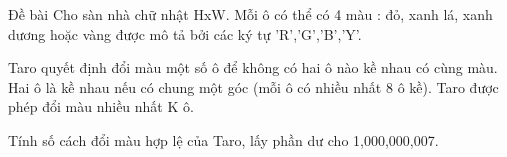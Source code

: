 Đề bài
Cho sàn nhà chữ nhật HxW. Mỗi ô có thể có 4 màu : đỏ, xanh lá, xanh dương hoặc vàng được mô tả bởi các ký tự 'R','G','B','Y'.  

   Taro quyết định đổi màu một số ô để không có hai ô nào kề nhau có cùng màu. Hai ô là kề nhau nếu có chung một góc (mỗi ô có nhiều nhất 8 ô kề). Taro được phép đổi màu nhiều nhất K ô.  

   Tính số cách đổi màu hợp lệ của Taro, lấy phần dư cho 1,000,000,007.